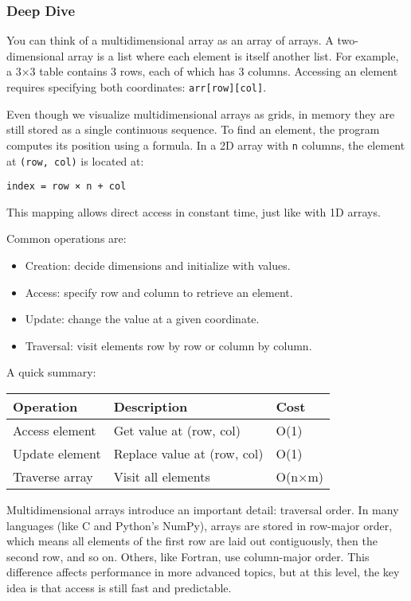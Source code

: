 \documentclass[
  letterpaper,
  DIV=11,
  numbers=noendperiod]{scrreprt}
\providecommand{\tightlist}{%
  \setlength{\itemsep}{0pt}\setlength{\parskip}{0pt}}
\begin{document}
\subsubsection{Deep Dive}\label{deep-dive-12}

You can think of a multidimensional array as an array of arrays. A
two-dimensional array is a list where each element is itself another
list. For example, a 3×3 table contains 3 rows, each of which has 3
columns. Accessing an element requires specifying both coordinates:
\texttt{arr{[}row{]}{[}col{]}}.

Even though we visualize multidimensional arrays as grids, in memory
they are still stored as a single continuous sequence. To find an
element, the program computes its position using a formula. In a 2D
array with \texttt{n} columns, the element at \texttt{(row,\ col)} is
located at:

\begin{verbatim}
index = row × n + col
\end{verbatim}

This mapping allows direct access in constant time, just like with 1D
arrays.

Common operations are:

\begin{itemize}
\tightlist
\item
  Creation: decide dimensions and initialize with values.
\item
  Access: specify row and column to retrieve an element.
\item
  Update: change the value at a given coordinate.
\item
  Traversal: visit elements row by row or column by column.
\end{itemize}

A quick summary:

\begin{longtable}[]{@{}lll@{}}
\toprule\noalign{}
Operation & Description & Cost \\
\midrule\noalign{}
\endhead
\bottomrule\noalign{}
\endlastfoot
Access element & Get value at (row, col) & O(1) \\
Update element & Replace value at (row, col) & O(1) \\
Traverse array & Visit all elements & O(n×m) \\
\end{longtable}

Multidimensional arrays introduce an important detail: traversal order.
In many languages (like C and Python's NumPy), arrays are stored in
row-major order, which means all elements of the first row are laid out
contiguously, then the second row, and so on. Others, like Fortran, use
column-major order. This difference affects performance in more advanced
topics, but at this level, the key idea is that access is still fast and
predictable.
\end{document}

